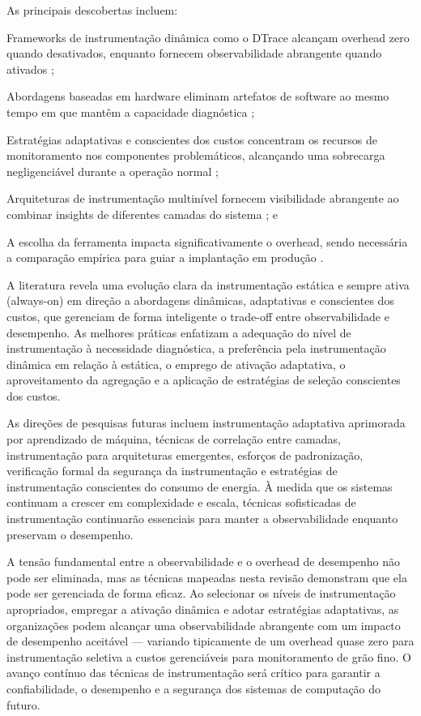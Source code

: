 \documentclass[sigconf, anonymous]{acmart}
\begin{document}
As principais descobertas incluem:

Frameworks de instrumentação dinâmica como o DTrace alcançam overhead zero quando desativados, enquanto fornecem observabilidade abrangente quando ativados \cite{cantrill_2004};

Abordagens baseadas em hardware eliminam artefatos de software ao mesmo tempo em que mantêm a capacidade diagnóstica \cite{spensky_2016};

Estratégias adaptativas e conscientes dos custos concentram os recursos de monitoramento nos componentes problemáticos, alcançando uma sobrecarga negligenciável durante a operação normal \cite{mos_2004, haghshenas_2023};

Arquiteturas de instrumentação multinível fornecem visibilidade abrangente ao combinar insights de diferentes camadas do sistema \cite{ghanta_2017, brown_2003}; e

A escolha da ferramenta impacta significativamente o overhead, sendo necessária a comparação empírica para guiar a implantação em produção \cite{volpert_2025}.

A literatura revela uma evolução clara da instrumentação estática e sempre ativa (always-on) em direção a abordagens dinâmicas, adaptativas e conscientes dos custos, que gerenciam de forma inteligente o trade-off entre observabilidade e desempenho. As melhores práticas enfatizam a adequação do nível de instrumentação à necessidade diagnóstica, a preferência pela instrumentação dinâmica em relação à estática, o emprego de ativação adaptativa, o aproveitamento da agregação e a aplicação de estratégias de seleção conscientes dos custos.

As direções de pesquisas futuras incluem instrumentação adaptativa aprimorada por aprendizado de máquina, técnicas de correlação entre camadas, instrumentação para arquiteturas emergentes, esforços de padronização, verificação formal da segurança da instrumentação e estratégias de instrumentação conscientes do consumo de energia. À medida que os sistemas continuam a crescer em complexidade e escala, técnicas sofisticadas de instrumentação continuarão essenciais para manter a observabilidade enquanto preservam o desempenho.

A tensão fundamental entre a observabilidade e o overhead de desempenho não pode ser eliminada, mas as técnicas mapeadas nesta revisão demonstram que ela pode ser gerenciada de forma eficaz. Ao selecionar os níveis de instrumentação apropriados, empregar a ativação dinâmica e adotar estratégias adaptativas, as organizações podem alcançar uma observabilidade abrangente com um impacto de desempenho aceitável — variando tipicamente de um overhead quase zero para instrumentação seletiva a custos gerenciáveis para monitoramento de grão fino. O avanço contínuo das técnicas de instrumentação será crítico para garantir a confiabilidade, o desempenho e a segurança dos sistemas de computação do futuro.
\end{document}
